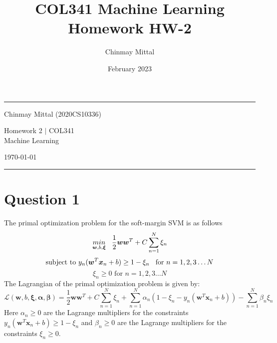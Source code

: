 \documentclass{article}
\title{COL341 Machine Learning Homework HW-2}
\author{Chinmay Mittal}
\date{February 2023}
\begin{document}
\hrule \medskip %
\begin{minipage}{0.295\textwidth} 
\raggedright
\footnotesize
\large
Chinmay Mittal (2020CS10336)
\end{minipage}
\begin{minipage}{0.4\textwidth} 
\centering 
\large 
Homework 2 $\vert$ COL341 \\ 
Machine Learning\\ 
\end{minipage}
\begin{minipage}{0.295\textwidth} 
\raggedleft
\today\hfill\\
\end{minipage}
\medskip\hrule 
\bigskip
\section*{Question 1}
The primal optimization problem for the soft-margin SVM is as follows
$$ \underset{\bm{w}, b, \bm{\xi}}{min} \hspace{3mm} \frac{1}{2}\bm{w}\bm{w}^T + C \sum_{n=1}^N \xi_{n}$$
$$\text{subject to   } y_n(\bm{w}^T \bm{x}_n + b) \geq 1 - \xi_{n} \hspace{3mm} \text{for   } n=1,2,3 
\dots N$$
$$ \xi_n \geq 0 \text{ for } n = 1,2,3 \dots N $$ 
The Lagrangian of the primal optimization problem is given by:
$$ \mathcal{L}(\bm{w}, b, \bm{\xi}, \bm{\alpha}, \bm{\beta}) = \frac{1}{2}\bm{w}\bm{w}^T + C \sum_{n=1}^N \xi_{n} + \sum_{n=1}^N \alpha_n ( 1- \xi_n - y_n(\bm{w}^T \bm{x}_n + b)) - \sum _{n=1}^N \beta_n \xi_n $$
Here $\alpha_n \geq 0$ are the Lagrange multipliers for the constraints $y_n(\bm{w}^T \bm{x}_n + b) \geq 1 - \xi_{n}$ and $\beta_n \geq 0 $ are the Lagrange multipliers for the constraints $ \xi_n \geq 0 $.
\end{document}
